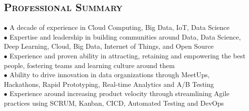 \begin{resume}


\section{\textsc{Professional Summary}}
$\bullet$ A decade of experience in Cloud Computing, Big Data, IoT, Data Science\\
$\bullet$ Expertise and leadership in building communities around Data, Data Science, Deep Learning, Cloud, Big Data, Internet of Things, and Open Source\\
$\bullet$ Experience and proven ability in attracting, retaining and empowering the best people, fostering teams and learning culture around them\\
$\bullet$ Ability to drive innovation in data organizations through MeetUps, Hackathons, Rapid Prototyping, Real-time Analytics and A/B Testing\\
$\bullet$ Experience around increasing product velocity through streamlining Agile practices using SCRUM, Kanban, CICD, Automated Testing and DevOps



\end{resume}
